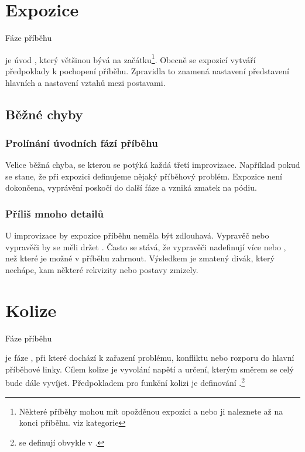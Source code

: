 \needspace{5cm} \section{Expozice} \label{expozice} {{Fáze příběhu}} 
 
 je úvod , který většinou bývá na začátku\footnote{Některé příběhy mohou mít opožděnou expozici a nebo ji naleznete až na konci příběhu. viz kategorie }. Obecně se expozicí vytváří předpoklady k pochopení příběhu. Zpravidla to znamená nastavení  představení hlavních  a nastavení vztahů mezi postavami. 
 
\subsection{ Běžné chyby }  
\subsubsection{ Prolínání úvodních fází příběhu } Velice běžná chyba, se kterou se potýká každá třetí improvizace. Například pokud se stane, že při expozici definujeme nějaký příběhový problém. Expozice není dokončena, vyprávění poskočí do další fáze a vzniká zmatek na pódiu. 
 
\subsubsection{ Příliš mnoho detailů } U  improvizace by expozice příběhu neměla být zdlouhavá. Vypravěč nebo vypravěči by se měli držet . Často se stává, že vypravěči nadefinují více  nebo , než které je možné v příběhu zahrnout. Výsledkem je zmatený divák, který nechápe, kam některé rekvizity nebo postavy zmizely. 
 
  
 
 
 
\needspace{5cm} \section{Kolize} \label{kolize} {{Fáze příběhu}} 
 
 je fáze , při které dochází k zařazení problému, konfliktu nebo rozporu do hlavní příběhové linky. Cílem kolize je vyvolání napětí a určení, kterým směrem se celý  bude dále vyvíjet. Předpokladem pro funkční kolizi je definování .\footnote{ se definují obvykle v .} 
 
